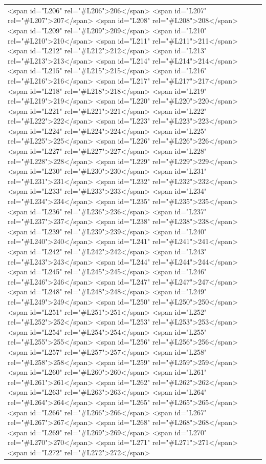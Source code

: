 \documentclass[a4paper,11pt,french]{article}
\begin{document}
\begin{tabular}{|m{8cm}|m{8cm}|}
<span id="L206" rel="#L206">206</span>
<span id="L207" rel="#L207">207</span>
<span id="L208" rel="#L208">208</span>
<span id="L209" rel="#L209">209</span>
<span id="L210" rel="#L210">210</span>
<span id="L211" rel="#L211">211</span>
<span id="L212" rel="#L212">212</span>
<span id="L213" rel="#L213">213</span>
<span id="L214" rel="#L214">214</span>
<span id="L215" rel="#L215">215</span>
<span id="L216" rel="#L216">216</span>
<span id="L217" rel="#L217">217</span>
<span id="L218" rel="#L218">218</span>
<span id="L219" rel="#L219">219</span>
<span id="L220" rel="#L220">220</span>
<span id="L221" rel="#L221">221</span>
<span id="L222" rel="#L222">222</span>
<span id="L223" rel="#L223">223</span>
<span id="L224" rel="#L224">224</span>
<span id="L225" rel="#L225">225</span>
<span id="L226" rel="#L226">226</span>
<span id="L227" rel="#L227">227</span>
<span id="L228" rel="#L228">228</span>
<span id="L229" rel="#L229">229</span>
<span id="L230" rel="#L230">230</span>
<span id="L231" rel="#L231">231</span>
<span id="L232" rel="#L232">232</span>
<span id="L233" rel="#L233">233</span>
<span id="L234" rel="#L234">234</span>
<span id="L235" rel="#L235">235</span>
<span id="L236" rel="#L236">236</span>
<span id="L237" rel="#L237">237</span>
<span id="L238" rel="#L238">238</span>
<span id="L239" rel="#L239">239</span>
<span id="L240" rel="#L240">240</span>
<span id="L241" rel="#L241">241</span>
<span id="L242" rel="#L242">242</span>
<span id="L243" rel="#L243">243</span>
<span id="L244" rel="#L244">244</span>
<span id="L245" rel="#L245">245</span>
<span id="L246" rel="#L246">246</span>
<span id="L247" rel="#L247">247</span>
<span id="L248" rel="#L248">248</span>
<span id="L249" rel="#L249">249</span>
<span id="L250" rel="#L250">250</span>
<span id="L251" rel="#L251">251</span>
<span id="L252" rel="#L252">252</span>
<span id="L253" rel="#L253">253</span>
<span id="L254" rel="#L254">254</span>
<span id="L255" rel="#L255">255</span>
<span id="L256" rel="#L256">256</span>
<span id="L257" rel="#L257">257</span>
<span id="L258" rel="#L258">258</span>
<span id="L259" rel="#L259">259</span>
<span id="L260" rel="#L260">260</span>
<span id="L261" rel="#L261">261</span>
<span id="L262" rel="#L262">262</span>
<span id="L263" rel="#L263">263</span>
<span id="L264" rel="#L264">264</span>
<span id="L265" rel="#L265">265</span>
<span id="L266" rel="#L266">266</span>
<span id="L267" rel="#L267">267</span>
<span id="L268" rel="#L268">268</span>
<span id="L269" rel="#L269">269</span>
<span id="L270" rel="#L270">270</span>
<span id="L271" rel="#L271">271</span>
<span id="L272" rel="#L272">272</span>

\end{tabular}
\end{document}
